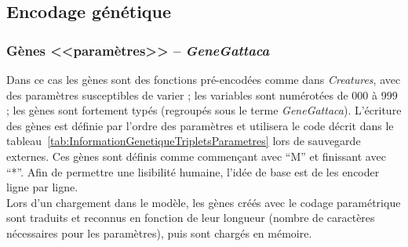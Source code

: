 \documentclass[11pt,twoside,a4paper]{article}
\begin{document}


\clearpage

\subsection{Encodage g{\'e}n{\'e}tique}

\subsubsection{G{\`e}nes <<param{\`e}tres>> -- \emph{GeneGattaca}}

Dans ce cas les g{\`e}nes sont des fonctions pr{\'e}-encod{\'e}es comme dans \textit{Creatures}, avec des param{\`e}tres susceptibles de varier ; les variables sont num{\'e}rot{\'e}es de 000 {\`a} 999 ; les g{\`e}nes sont fortement typ{\'e}s (regroup{\'e}s sous le terme \emph{GeneGattaca}). L'{\'e}criture des g{\`e}nes est d{\'e}finie par l'ordre des param{\`e}tres et utilisera le code d{\'e}crit dans le tableau~\ref{tab:InformationGenetiqueTripletsParametres} lors de sauvegarde externes. Ces g{\`e}nes sont d{\'e}finis comme commen\c{c}ant avec ``M'' et finissant avec ``*''. Afin de permettre une lisibilit{\'e} humaine, l'id{\'e}e de base est de les encoder ligne par ligne.~\\

Lors d'un chargement dans le mod{\`e}le, les g{\`e}nes cr{\'e}{\'e}s avec le codage param{\'e}trique sont traduits et reconnus en fonction de leur longueur (nombre de caract{\`e}res n{\'e}cessaires pour les param{\`e}tres), puis sont charg{\'e}s en m{\'e}moire. 
\end{document}
